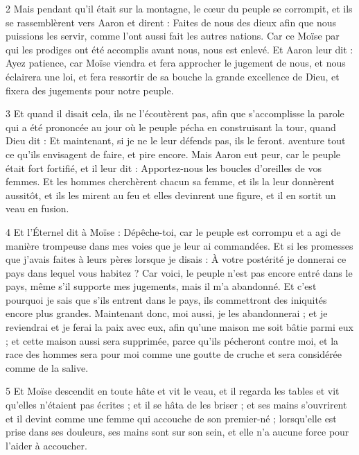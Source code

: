 \par 2 Mais pendant qu'il était sur la montagne, le cœur du peuple se corrompit, et ils se rassemblèrent vers Aaron et dirent : Faites de nous des dieux afin que nous puissions les servir, comme l'ont aussi fait les autres nations. Car ce Moïse par qui les prodiges ont été accomplis avant nous, nous est enlevé. Et Aaron leur dit : Ayez patience, car Moïse viendra et fera approcher le jugement de nous, et nous éclairera une loi, et fera ressortir de sa bouche la grande excellence de Dieu, et fixera des jugements pour notre peuple.

\par 3 Et quand il disait cela, ils ne l'écoutèrent pas, afin que s'accomplisse la parole qui a été prononcée au jour où le peuple pécha en construisant la tour, quand Dieu dit : Et maintenant, si je ne le leur défends pas, ils le feront. aventure tout ce qu'ils envisagent de faire, et pire encore. Mais Aaron eut peur, car le peuple était fort fortifié, et il leur dit : Apportez-nous les boucles d'oreilles de vos femmes. Et les hommes cherchèrent chacun sa femme, et ils la leur donnèrent aussitôt, et ils les mirent au feu et elles devinrent une figure, et il en sortit un veau en fusion.

\par 4 Et l'Éternel dit à Moïse : Dépêche-toi, car le peuple est corrompu et a agi de manière trompeuse dans mes voies que je leur ai commandées. Et si les promesses que j'avais faites à leurs pères lorsque je disais : À votre postérité je donnerai ce pays dans lequel vous habitez ? Car voici, le peuple n'est pas encore entré dans le pays, même s'il supporte mes jugements, mais il m'a abandonné. Et c'est pourquoi je sais que s'ils entrent dans le pays, ils commettront des iniquités encore plus grandes. Maintenant donc, moi aussi, je les abandonnerai ; et je reviendrai et je ferai la paix avec eux, afin qu'une maison me soit bâtie parmi eux ; et cette maison aussi sera supprimée, parce qu'ils pécheront contre moi, et la race des hommes sera pour moi comme une goutte de cruche et sera considérée comme de la salive.

\par 5 Et Moïse descendit en toute hâte et vit le veau, et il regarda les tables et vit qu'elles n'étaient pas écrites ; et il se hâta de les briser ; et ses mains s'ouvrirent et il devint comme une femme qui accouche de son premier-né ; lorsqu'elle est prise dans ses douleurs, ses mains sont sur son sein, et elle n'a aucune force pour l'aider à accoucher.

